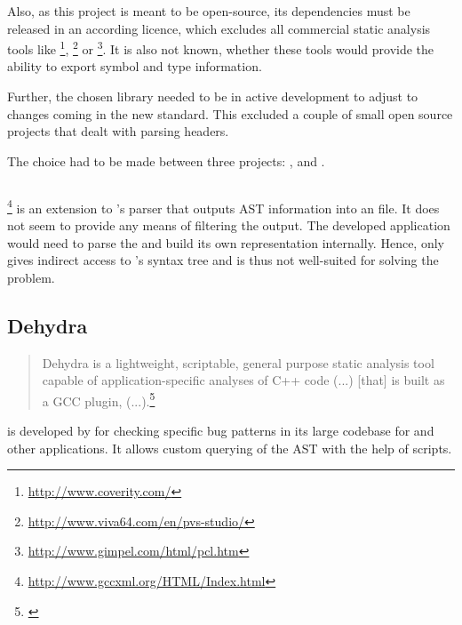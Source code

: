 Also, as this project is meant to be open-source, its dependencies must be released in an according licence, which excludes all commercial static analysis tools like \footnote{\url{http://www.coverity.com/}}, \footnote{\url{http://www.viva64.com/en/pvs-studio/}} or \footnote{\url{http://www.gimpel.com/html/pcl.htm}}. It is also not known, whether these tools would provide the ability to export symbol and type information.

Further, the chosen library needed to be in active development to adjust to changes coming in the new  standard. This excluded a couple of small open source projects that dealt with parsing  headers.

The choice had to be made between three projects: ,  and .

\subsection{}

\footnote{\url{http://www.gccxml.org/HTML/Index.html}} is an extension to 's  parser that outputs AST information into an  file. It does not seem to provide any means of filtering the output. The developed application would need to parse the  and build its own representation internally. Hence,  only gives indirect access to 's syntax tree and is thus not well-suited for solving the problem.

\subsection{Dehydra}

\begin{quotation}
Dehydra is a lightweight, scriptable, general purpose static analysis tool capable of application-specific analyses of C++ code (...) [that] is built as a GCC plugin, (...).\footnote{\citep{MDNDehydra}}
\end{quotation}

 is developed by  for checking specific bug patterns in its large codebase for  and other  applications. It allows custom querying of the AST with the help of  scripts.

